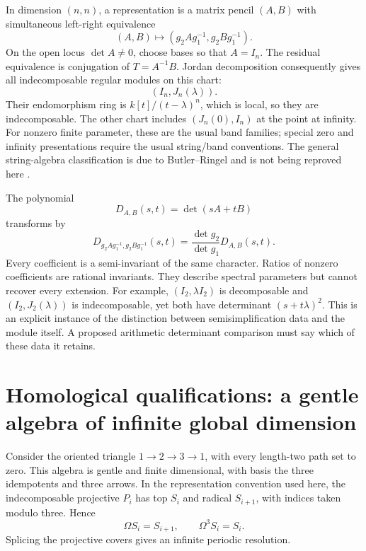 In dimension \((n,n)\), a representation is a matrix pencil \((A,B)\) with simultaneous left-right equivalence
\[
 (A,B)\longmapsto(g_2Ag_1^{-1},g_2Bg_1^{-1}).
\]
On the open locus \(\det A\ne0\), choose bases so that \(A=I_n\). The residual equivalence is conjugation of \(T=A^{-1}B\). Jordan decomposition consequently gives all indecomposable regular modules on this chart:
\[
 (I_n,J_n(\lambda)).
\]
Their endomorphism ring is \(k[t]/(t-\lambda)^n\), which is local, so they are indecomposable. The other chart includes \((J_n(0),I_n)\) at the point at infinity. For nonzero finite parameter, these are the usual band families; special zero and infinity presentations require the usual string/band conventions. The general string-algebra classification is due to Butler--Ringel and is not being reproved here \citep{GIButlerRingel1987}.

The polynomial
\[
 D_{A,B}(s,t)=\det(sA+tB)
\]
transforms by
\[
 D_{g_2Ag_1^{-1},g_2Bg_1^{-1}}(s,t)
       =\frac{\det g_2}{\det g_1}D_{A,B}(s,t).
 \tag{G3}\label{eq:pencil-weight}
\]
Every coefficient is a semi-invariant of the same character. Ratios of nonzero coefficients are rational invariants. They describe spectral parameters but cannot recover every extension. For example, \((I_2,\lambda I_2)\) is decomposable and \((I_2,J_2(\lambda))\) is indecomposable, yet both have determinant \((s+t\lambda)^2\). This is an explicit instance of the distinction between semisimplification data and the module itself. A proposed arithmetic determinant comparison must say which of these data it retains.

\section{Homological qualifications: a gentle algebra of infinite global dimension}
Consider the oriented triangle \(1\to2\to3\to1\), with every length-two path set to zero. This algebra is gentle and finite dimensional, with basis the three idempotents and three arrows. In the representation convention used here, the indecomposable projective \(P_i\) has top \(S_i\) and radical \(S_{i+1}\), with indices taken modulo three. Hence
\[
 \Omega S_i=S_{i+1},\qquad \Omega^3S_i=S_i.
 \tag{G4}
\]
Splicing the projective covers gives an infinite periodic resolution.

